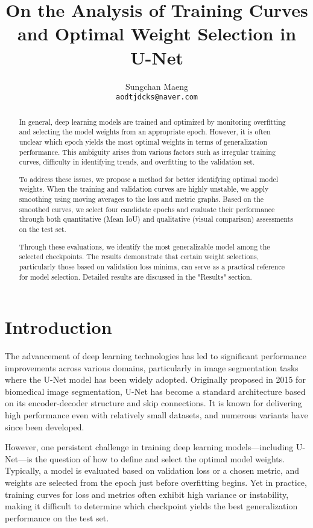 \documentclass{article}
\title{On the Analysis of Training Curves and Optimal Weight Selection in U-Net}
\author{%
  Sungchan Maeng \\
  \texttt{aodtjdcks@naver.com} \\
}
\begin{document}
\maketitle


\begin{abstract}
  In general, deep learning models are trained and optimized by monitoring overfitting and selecting the model weights from an appropriate epoch. However, it is often unclear which epoch yields the most optimal weights in terms of generalization performance. This ambiguity arises from various factors such as irregular training curves, difficulty in identifying trends, and overfitting to the validation set.
  
  To address these issues, we propose a method for better identifying optimal model weights. When the training and validation curves are highly unstable, we apply smoothing using moving averages to the loss and metric graphs. Based on the smoothed curves, we select four candidate epochs and evaluate their performance through both quantitative (Mean IoU) and qualitative (visual comparison) assessments on the test set.
  
  Through these evaluations, we identify the most generalizable model among the selected checkpoints. The results demonstrate that certain weight selections, particularly those based on validation loss minima, can serve as a practical reference for model selection. Detailed results are discussed in the "Results" section.
\end{abstract}


\section{Introduction}


The advancement of deep learning technologies has led to significant performance improvements across various domains, particularly in image segmentation tasks where the U-Net model has been widely adopted. Originally proposed in 2015 for biomedical image segmentation, U-Net has become a standard architecture based on its encoder-decoder structure and skip connections. It is known for delivering high performance even with relatively small datasets, and numerous variants have since been developed.

However, one persistent challenge in training deep learning models—including U-Net—is the question of how to define and select the optimal model weights. Typically, a model is evaluated based on validation loss or a chosen metric, and weights are selected from the epoch just before overfitting begins. Yet in practice, training curves for loss and metrics often exhibit high variance or instability, making it difficult to determine which checkpoint yields the best generalization performance on the test set.
\end{document}
